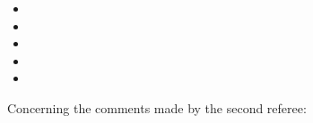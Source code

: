 \documentclass[11pt,a4paper,sans]{moderncv}        %
\begin{document}
\begin{itemize}
	\item 
	
	\item
	
	\item 
	
	\item 
	
	\item
\end{itemize}




Concerning the comments made by the second referee:


\end{document}
